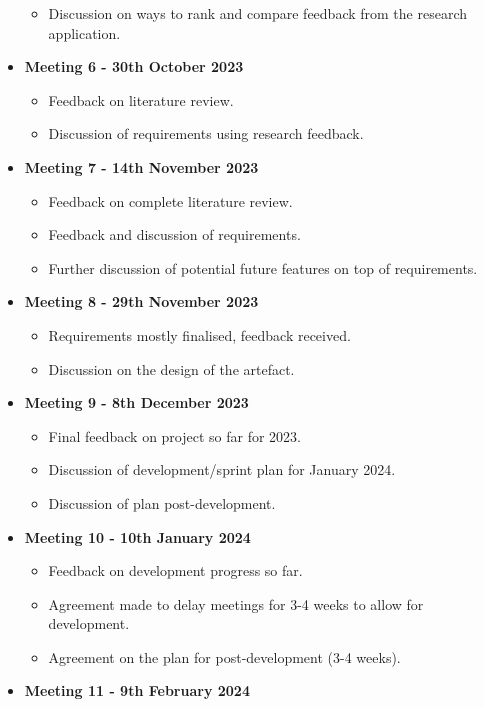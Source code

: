 \begin{itemize}
\begin{itemize}
        \item Discussion on ways to rank and compare feedback from the research application.
    \end{itemize}
    \item \textbf{Meeting 6 - 30th October 2023}
    \begin{itemize}
        \item Feedback on literature review.
        \item Discussion of requirements using research feedback.
    \end{itemize}
    \item \textbf{Meeting 7 - 14th November 2023}
    \begin{itemize}
        \item Feedback on complete literature review.
        \item Feedback and discussion of requirements.
        \item Further discussion of potential future features on top of requirements.
    \end{itemize}
    \item \textbf{Meeting 8 - 29th November 2023}
    \begin{itemize}
        \item Requirements mostly finalised, feedback received.
        \item Discussion on the design of the artefact.
    \end{itemize}
    \item \textbf{Meeting 9 - 8th December 2023}
    \begin{itemize}
        \item Final feedback on project so far for 2023.
        \item Discussion of development/sprint plan for January 2024.
        \item Discussion of plan post-development.
    \end{itemize}
    \item \textbf{Meeting 10 - 10th January 2024}
    \begin{itemize}
        \item Feedback on development progress so far.
        \item Agreement made to delay meetings for 3-4 weeks to allow for development.
        \item Agreement on the plan for post-development (3-4 weeks).
    \end{itemize}
    \item \textbf{Meeting 11 - 9th February 2024}

\end{itemize}

